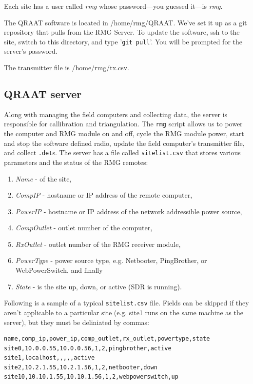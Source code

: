 \documentclass[letter]{article}
\begin{document}
Each site has a user called \textit{rmg} whose password---you guessed it---is \textit{rmg}. 

The QRAAT software is located in /home/rmg/QRAAT. We've set it up as a git 
repository that pulls from the RMG Server. To update the software, ssh to the site, 
switch to this directory, and type '\texttt{git pull}'. You will be prompted for 
the server's password.  

The transmitter file is /home/rmg/tx.csv. 

\subsection{QRAAT server}
Along with managing the field computers and collecting data, the server is responsible for
callibration and triangulation. The \texttt{rmg} script allows us to power the computer and 
RMG module on and off, cycle the RMG module power, start and stop the software defined radio, 
update the field computer's transmitter file, and collect \texttt{.det}s. The server has a 
file called \texttt{sitelist.csv} that stores various parameters and the status of the RMG remotes:
\begin{enumerate}
  \item \textit{Name} - of the site, 
  \item \textit{CompIP} - hostname or IP address of the remote computer, 
  \item \textit{PowerIP} - hostname or IP address of the network addressible power source,
  \item \textit{CompOutlet} - outlet number of the computer, 
  \item \textit{RxOutlet} - outlet number of the RMG receiver module, 
  \item \textit{PowerType} - power source type, e.g. Netbooter, PingBrother, or WebPowerSwitch, and finally
  \item \textit{State} - is the site up, down, or active (SDR is running). 
\end{enumerate}
Following is a sample of a typical \texttt{sitelist.csv} file. Fields can be skipped if they aren't applicable
to a particular site (e.g. site1 runs on the same machine as the server), but they must be deliniated by 
commas:
\begin{verbatim}
name,comp_ip,power_ip,comp_outlet,rx_outlet,powertype,state
site0,10.0.0.55,10.0.0.56,1,2,pingbrother,active
site1,localhost,,,,,active
site2,10.2.1.55,10.2.1.56,1,2,netbooter,down
site10,10.10.1.55,10.10.1.56,1,2,webpowerswitch,up
\end{verbatim}
\end{document}
